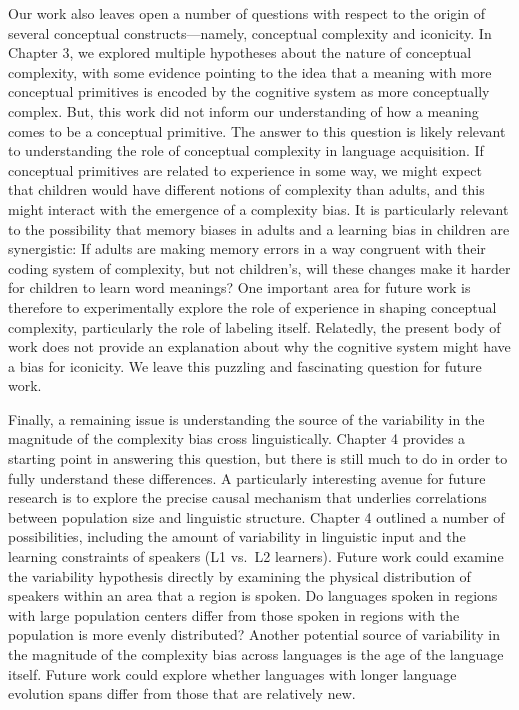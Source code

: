 Our work also leaves open a number of questions with respect to the origin of several conceptual constructs---namely, conceptual complexity and iconicity. In Chapter 3, we explored multiple hypotheses about the nature of conceptual complexity, with some evidence pointing to the idea that a meaning with more conceptual primitives is encoded by the cognitive system as more conceptually complex. But, this work did not inform our understanding of how a meaning comes to be a conceptual primitive. The answer to this question is likely relevant to understanding the role of conceptual complexity in language acquisition. If conceptual primitives are related to experience in some way, we might expect that children would have different notions of complexity than adults, and this might interact with the emergence of a complexity bias. It is particularly relevant to the possibility that memory biases in adults and a learning bias in children are synergistic: If adults are making memory errors in a way congruent with their coding system of complexity, but not children's, will these changes make it harder for children to learn word meanings? One important area for future work is therefore  to experimentally explore the role of experience in shaping conceptual complexity, particularly the role of labeling itself.  Relatedly, the present body of  work does not provide an explanation about why the cognitive system might have a bias for iconicity. We leave this puzzling and fascinating question for future work.


Finally, a remaining issue is understanding the source of the variability in the magnitude of the complexity bias cross linguistically. Chapter 4 provides a starting point in answering this question, but there is still much to do in order to fully understand these differences. A particularly interesting avenue for future research is to explore the precise causal mechanism that underlies correlations between population size and linguistic structure. Chapter 4 outlined a number of possibilities, including the amount of variability in linguistic input and the learning constraints of speakers (L1 vs.\ L2 learners). Future work could examine the variability hypothesis directly by examining the physical distribution of speakers within an area that a region is spoken. Do languages spoken in regions with  large population centers differ from those spoken in regions with the population is more evenly distributed? Another potential source of variability in the magnitude of the complexity bias across languages is the age of the language itself. Future work could explore whether languages with longer language evolution spans differ from those that are relatively new. 

